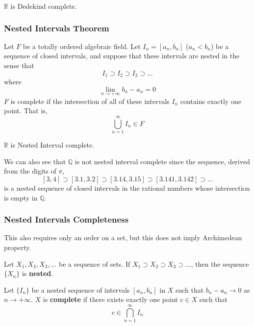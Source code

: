 \documentclass{article}
\begin{document}
        \begin{lemma}
          $\mathbb{R}$ is Dedekind complete. 
        \end{lemma}

      \subsubsection{Nested Intervals Theorem}

        \begin{definition}
          Let $F$ be a totally ordered algebraic field. Let $I_n= [a_n, b_n]$ ($a_n < b_n$) be a sequence of closed intervals, and suppose that these intervals are nested in the sense that
          \[I_1 \supset I_2 \supset I_3 \supset \ldots\]
          where 
          \[\lim_{n \rightarrow + \infty} b_n - a_n = 0\]
          $F$ is complete if the intersection of all of these intervals $I_n$ contains exactly one point. That is, 
          \[\bigcup_{n=1}^\infty I_n \in F\]
        \end{definition}

        \begin{lemma}
          $\mathbb{R}$ is Nested Interval complete. 
        \end{lemma}

        We can also see that $\mathbb{Q}$ is not nested interval complete since the sequence, derived from the digits of $\pi$, 
        \[[3,4] \supset [3.1, 3.2] \supset [3.14, 3.15] \supset [3.141, 3.142] \supset \ldots\]
        is a nested sequence of closed intervals in the rational numbers whose intersection is empty in $\mathbb{Q}$. 

    \subsubsection{Nested Intervals Completeness} 
      
      This also requires only an order on a set, but this does not imply Archimedean property. 

      \begin{definition}
        Let $X_1, X_2, X_3, ... $ be a sequence of sets. If $X_1 \supset X_2 \supset X_3 \supset ... $, then the sequence $\{X_n\}$ is \textbf{nested}. 
      \end{definition}

      \begin{theorem}
        Let $\{I_n\}$ be a nested sequence of intervals $[a_n, b_n]$ in $X$ such that $b_n - a_n \rightarrow 0$ as $n \rightarrow +\infty$. $X$ is \textbf{complete} if there exists exactly one point $c \in X$ such that 
        \[c \in \bigcap_{n=1}^\infty I_n \]
      \end{theorem}
\end{document}
